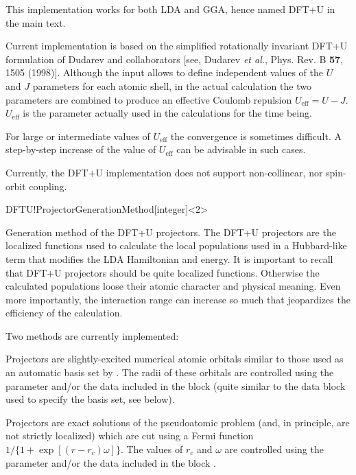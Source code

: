 \note This implementation works for both LDA and GGA, hence named
DFT+U in the main text.

\note Current implementation is based on the simplified rotationally
invariant DFT+U formulation of Dudarev and collaborators [see, Dudarev
\textit{et al.}, Phys. Rev. B \textbf{57}, 1505 (1998)].  Although the
input allows to define independent values of the $U$ and $J$
parameters for each atomic shell, in the actual calculation the two
parameters are combined to produce an effective Coulomb repulsion
$U_{\mathrm{eff}}=U-J$. $U_{\mathrm{eff}}$ is the parameter actually
used in the calculations for the time being.


For large or intermediate values of $U_{\mathrm{eff}}$ the convergence
is sometimes difficult. A step-by-step increase of the
value of $U_{\mathrm{eff}}$ can be advisable in such cases.

Currently, the DFT+U implementation does not support non-collinear, nor
spin-orbit coupling.

\begin{fdfentry}{DFTU!ProjectorGenerationMethod}[integer]<2>
  
  Generation method of the DFT+U projectors. The DFT+U projectors are
  the localized functions used to calculate the local populations used
  in a Hubbard-like term that modifies the LDA Hamiltonian and
  energy. It is important to recall that DFT+U projectors should be
  quite localized functions. Otherwise the calculated populations
  loose their atomic character and physical meaning. Even more
  importantly, the interaction range can increase so much that
  jeopardizes the efficiency of the calculation.

  Two methods are currently implemented:
  \begin{fdfoptions}
    \option[1]%
    Projectors are slightly-excited numerical atomic orbitals similar
    to those used as an automatic basis set by \siesta.  The radii of
    these orbitals are controlled using the parameter
     and/or the data included in the block
     (quite similar to the data block 
    used to specify the basis set, see below).

    \option[2]%
    Projectors are exact solutions of the pseudoatomic problem (and,
    in principle, are not strictly localized) which are cut using a
    Fermi function $1/\{1+\exp[(r-r_c)\omega]\}$.  The values of $r_c$
    and $\omega$ are controlled using the parameter 
    and/or the data included in the block .

  \end{fdfoptions}

\end{fdfentry}

